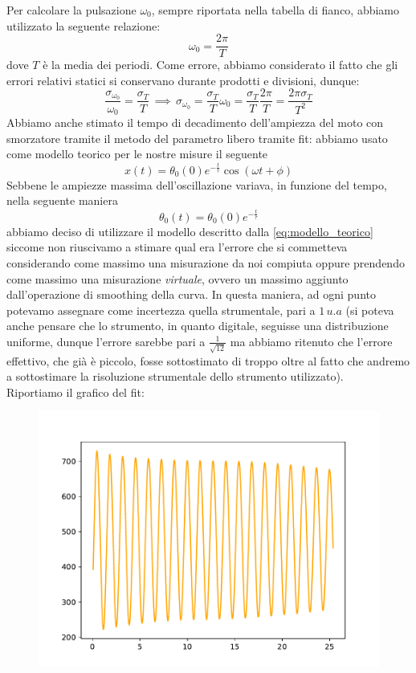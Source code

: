 \documentclass{article}
\begin{document}
\noindent Per calcolare la pulsazione $\omega_0$, sempre riportata nella tabella di fianco, abbiamo utilizzato la seguente relazione:
\begin{equation}
	\omega_0 = \frac{2\pi}{T}
\end{equation}
dove $T$ è la media dei periodi. Come errore, abbiamo considerato il fatto che gli errori relativi statici si conservano durante prodotti e divisioni, dunque:
\begin{equation*}
	\frac{\sigma_{\omega_0}}{\omega_0} = \frac{\sigma_{T}}{T} \, \implies \, \sigma_{\omega_0} = \frac{\sigma_T}{T} \omega_0 = \frac{\sigma_T}{T} \frac{2\pi}{T} = \frac{2\pi \sigma_T}{T^2}
\end{equation*}
Abbiamo anche stimato il tempo di decadimento dell'ampiezza del moto con smorzatore tramite il metodo del parametro libero tramite fit: abbiamo usato come modello teorico per le nostre misure il seguente
\begin{equation}
	x(t) = \theta_0 (0)e^{-\frac{t}{\tau}}\cos{\left( \omega t + \phi \right) }
	\label{eq:modello_teorico}
\end{equation}
Sebbene le ampiezze massima dell'oscillazione variava, in funzione del tempo, nella seguente maniera
$$
	\theta_0 (t) = \theta_0 (0) e^{-\frac{t}{\tau}}
$$
abbiamo deciso di utilizzare il modello descritto dalla \ref{eq:modello_teorico} siccome non riuscivamo a stimare qual era l'errore che si commetteva considerando come massimo una misurazione da noi compiuta oppure prendendo come massimo una misurazione \emph{virtuale}, ovvero un massimo aggiunto dall'operazione di smoothing della curva. In questa maniera, ad ogni punto potevamo assegnare come incertezza quella strumentale, pari a $1 \, u.a$ (si poteva anche pensare che lo strumento, in quanto digitale, seguisse una distribuzione uniforme, dunque l'errore sarebbe pari a $\frac{1}{\sqrt{12}}$ ma abbiamo ritenuto che l'errore effettivo, che già è piccolo, fosse sottostimato di troppo oltre al fatto che andremo a sottostimare la risoluzione strumentale dello strumento utilizzato). \\
Riportiamo il grafico del fit:

\begin{figure}
	\centering
	\includegraphics[scale=0.6]{Grafico_oscillazione_accoppiate_senza_smorzatore.pdf}
\end{figure}
\end{document}
